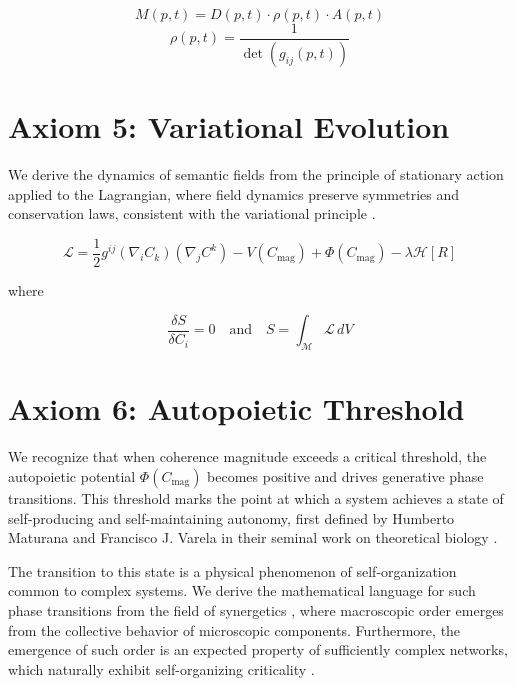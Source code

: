 \begin{equation}
M(p,t) = D(p,t) \cdot \rho(p,t) \cdot A(p,t)
\end{equation}
\begin{equation}
\rho(p,t) = \frac{1}{\det(g_{ij}(p,t))}
\end{equation}


\section{Axiom 5: Variational Evolution}\label{axiom_5}

We derive the dynamics of semantic fields from the principle of stationary action applied to the Lagrangian, where field dynamics preserve symmetries and conservation laws, consistent with the variational principle \autocite{GoldsteinPooleSafko2002, Arnold1989}.

\begin{equation}\label{eq:lagrangian_axiom}
\mathcal{L} = \frac{1}{2} g^{ij} (\nabla_i C_k)(\nabla_j C^k) - V(C_{\text{mag}}) + \Phi(C_{\text{mag}}) - \lambda \mathcal{H}[R]
\end{equation}

where

\begin{equation}
\frac{\delta S}{\delta C_i} = 0 \quad \text{and} \quad S = \int_{\mathcal{M}} \mathcal{L} \, dV
\end{equation}


\section{Axiom 6: Autopoietic Threshold}\label{axiom_6}

We recognize that when coherence magnitude exceeds a critical threshold, the autopoietic potential \(\Phi(C_{\text{mag}})\) becomes positive and drives generative phase transitions. This threshold marks the point at which a system achieves a state of self-producing and self-maintaining autonomy, first defined by Humberto Maturana and Francisco J. Varela in their seminal work on theoretical biology \autocite{MaturanaVarela1980}.

The transition to this state is a physical phenomenon of self-organization common to complex systems. We derive the mathematical language for such phase transitions from the field of synergetics \autocite{Haken1983}, where macroscopic order emerges from the collective behavior of microscopic components. Furthermore, the emergence of such order is an expected property of sufficiently complex networks, which naturally exhibit self-organizing criticality \autocite{BakTangWiesenfeld1987}.

